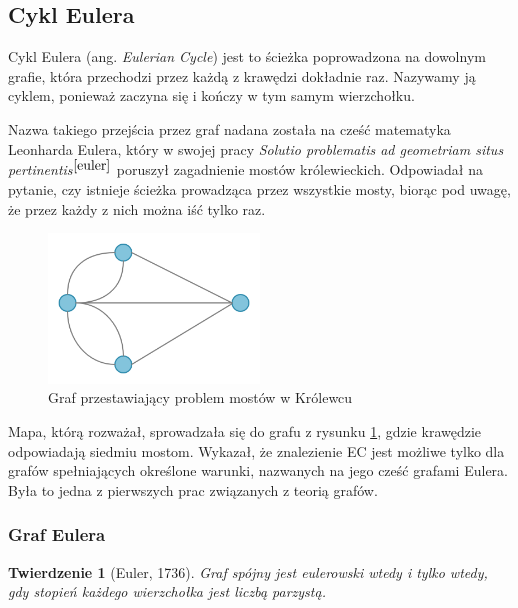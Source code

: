 \documentclass[a4paper, 12pt, twoside, openright]{article}
\newtheorem{theorem}{Twierdzenie}
\begin{document}
\subsection{Cykl Eulera} \label{SciezkaEulera}

\indent\par
	Cykl Eulera (ang. \textit{Eulerian Cycle}) jest to ścieżka poprowadzona na dowolnym grafie, która przechodzi przez każdą z krawędzi dokładnie raz. Nazywamy ją cyklem, ponieważ zaczyna się i kończy w tym samym wierzchołku. 
	
	Nazwa takiego przejścia przez graf nadana została na cześć matematyka Leonharda Eulera, który w swojej pracy \textit{Solutio problematis ad geometriam situs pertinentis}$^{\cite{euler}}$ poruszył zagadnienie mostów królewieckich. Odpowiadał na pytanie, czy istnieje ścieżka prowadząca przez wszystkie mosty, biorąc pod uwagę, że przez każdy z nich można iść tylko raz. 
	
	\begin{figure}[H]
		\centering
		\includegraphics[width=0.5\textwidth]{img/wstep/w1}
		\caption[]{Graf przestawiający problem mostów w Królewcu}
		\label{krolewiec}
	\end{figure}

	Mapa, którą rozważał, sprowadzała się do grafu z rysunku \ref{krolewiec}, gdzie krawędzie odpowiadają siedmiu mostom. Wykazał, że znalezienie EC jest możliwe tylko dla grafów spełniających określone warunki, nazwanych na jego cześć grafami Eulera. Była to jedna z pierwszych prac związanych z teorią grafów.
	
	\subsubsection{Graf Eulera}
	\begin{theorem}[Euler, 1736]
		\label{twEuleraUG}
		Graf spójny jest eulerowski wtedy i tylko wtedy, gdy
		stopień każdego wierzchołka jest liczbą parzystą.	
	\end{theorem}
\end{document}
